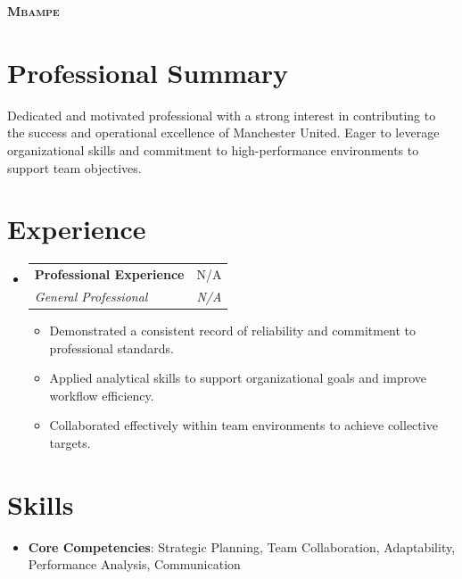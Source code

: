 \documentclass[letterpaper,11pt]{article}
\makeatletter
\newcommand{\resumeItem}[1]{
\item\small{
{#1 \vspace{-2pt}}
}
}
\newcommand{\resumeSubheading}[4]{
\vspace{-2pt}\item
\begin{tabular*}{0.97\textwidth}[t]{l@{\extracolsep{\fill}}r}
\textbf{#1} & #2 \\
\textit{\small#3} & \textit{\small #4} \\
\end{tabular*}\vspace{-7pt}
}
\newcommand{\resumeSubHeadingListStart}{\begin{itemize}[leftmargin=0.15in, label={}]}
\newcommand{\resumeSubHeadingListEnd}{\end{itemize}}
\newcommand{\resumeItemListStart}{\begin{itemize}}
\newcommand{\resumeItemListEnd}{\end{itemize}\vspace{-5pt}}
\makeatother
\begin{document}
\begin{center}
\textbf{\Huge \scshape Mbampe} \\ \vspace{1pt}
\end{center}

\section{Professional Summary}
Dedicated and motivated professional with a strong interest in contributing to the success and operational excellence of Manchester United. Eager to leverage organizational skills and commitment to high-performance environments to support team objectives.

\section{Experience}
\resumeSubHeadingListStart
\resumeSubheading{Professional Experience}{N/A}{General Professional}{N/A}
\resumeItemListStart
\resumeItem{Demonstrated a consistent record of reliability and commitment to professional standards.}
\resumeItem{Applied analytical skills to support organizational goals and improve workflow efficiency.}
\resumeItem{Collaborated effectively within team environments to achieve collective targets.}
\resumeItemListEnd
\resumeSubHeadingListEnd

\section{Skills}
\begin{itemize}[leftmargin=0.15in, label={}]
\item{
\textbf{Core Competencies}{: Strategic Planning, Team Collaboration, Adaptability, Performance Analysis, Communication}
}
\end{itemize}
\end{document}
